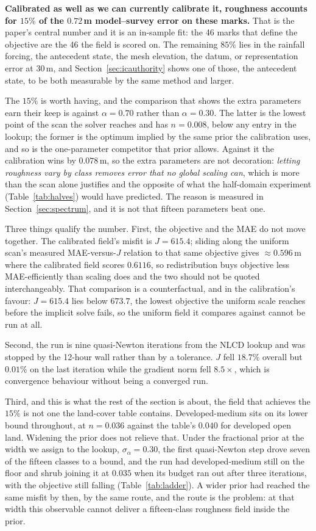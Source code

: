 \documentclass[11pt]{article}
\begin{document}
\textbf{Calibrated as well as we can currently calibrate it, roughness
accounts for $15\%$ of the $0.72$\,m model--survey error on these
marks.} That is the paper's central number and it is an in-sample fit:
the 46 marks that define the objective are the 46 the field is scored
on. The remaining $85\%$ lies in the rainfall forcing, the antecedent
state, the mesh elevation, the datum, or representation error at
30\,m, and Section~\ref{sec:icauthority} shows one of those, the
antecedent state, to be both measurable by the same method and larger.

The $15\%$ is worth having, and the comparison that shows the extra
parameters earn their keep is against $\alpha = 0.70$ rather than
$\alpha = 0.30$. The latter is the lowest point of the scan the solver
reaches and has $n = 0.008$, below any entry in the lookup; the former is the optimum implied by the same prior the
calibration uses, and so is the one-parameter competitor that prior
allows. Against it the calibration wins by $0.078$\,m, so the extra
parameters are not decoration: \emph{letting roughness vary by class
removes error that no global scaling can}, which is more than the scan
alone justifies and the opposite of what the half-domain experiment
(Table~\ref{tab:halves}) would have predicted. The reason is
measured in Section~\ref{sec:spectrum}, and it is not that fifteen
parameters beat one.

Three things qualify the number. First, the objective and the MAE do
not move together. The calibrated field's misfit is $J = 615.4$;
sliding along the uniform scan's measured MAE-versus-$J$ relation to
that same objective gives $\approx 0.596$\,m where the calibrated field
scores $0.6116$, so redistribution buys objective less
MAE-efficiently than scaling does and the two should not be quoted
interchangeably. That comparison is a counterfactual, and in the
calibration's favour: $J = 615.4$ lies below $673.7$, the lowest
objective the uniform scale reaches before the implicit solve fails,
so the uniform field it compares against cannot be run at all.

Second, the run is nine quasi-Newton iterations from the NLCD lookup
and was stopped by the 12-hour wall rather than by a tolerance. $J$
fell $18.7\%$ overall but $0.01\%$ on the last iteration while the
gradient norm fell $8.5\times$, which is convergence behaviour without
being a converged run.

Third, and this is what the rest of the section is about, the field
that achieves the $15\%$ is not one the land-cover table contains.
Developed-medium sits on its lower bound throughout, at $n = 0.036$
against the table's $0.040$ for developed open land. Widening the
prior does not relieve that. Under the fractional prior at the width
we assign to the lookup, $\sigma_\alpha = 0.30$, the first
quasi-Newton step drove seven of the fifteen classes to a bound, and
the run had developed-medium still on the floor and shrub joining it
at $0.035$ when its budget ran out after three iterations, with the
objective still falling (Table~\ref{tab:ladder}). A wider prior had
reached the same misfit by then, by the same route, and the route is
the problem:
at that width this observable cannot deliver a fifteen-class roughness
field inside the prior.
\end{document}
